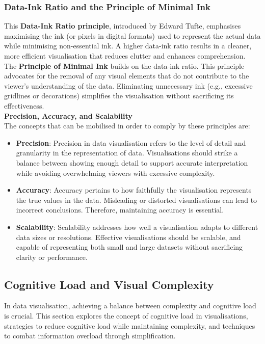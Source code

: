 \documentclass{article}\usepackage[]{graphicx}\usepackage[]{xcolor}
\begin{document}
\subsubsection{Data-Ink Ratio and the Principle of Minimal Ink} 
This \textbf{Data-Ink Ratio principle}, introduced by Edward Tufte, emphasises maximising the ink (or pixels in digital formats) used to represent the actual data while minimising non-essential ink. A higher data-ink ratio results in a cleaner, more efficient visualisation that reduces clutter and enhances comprehension.\\
The \textbf{Principle of Minimal Ink} builds on the data-ink ratio. This principle advocates for the removal of any visual elements that do not contribute to the viewer's understanding of the data. Eliminating unnecessary ink (e.g., excessive gridlines or decorations) simplifies the visualisation without sacrificing its effectiveness.\\

\textbf{Precision, Accuracy, and Scalability}\\
The concepts that can be mobilised in order to comply by these principles are:
\begin{itemize}
    \item \textbf{Precision}: Precision in data visualisation refers to the level of detail and granularity in the representation of data. Visualisations should strike a balance between showing enough detail to support accurate interpretation while avoiding overwhelming viewers with excessive complexity.
    \item \textbf{Accuracy}: Accuracy pertains to how faithfully the visualisation represents the true values in the data. Misleading or distorted visualisations can lead to incorrect conclusions. Therefore, maintaining accuracy is essential.
    \item \textbf{Scalability}: Scalability addresses how well a visualisation adapts to different data sizes or resolutions. Effective visualisations should be scalable, and capable of representing both small and large datasets without sacrificing clarity or performance.
\end{itemize}

\subsection{Cognitive Load and Visual Complexity}
In data visualisation, achieving a balance between complexity and cognitive load is crucial. This section explores the concept of cognitive load in visualisations, strategies to reduce cognitive load while maintaining complexity, and techniques to combat information overload through simplification.\\
\end{document}
